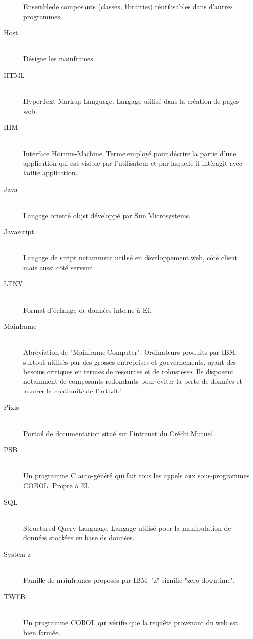 \documentclass[a4paper,french,8pt]{article}
\begin{document}
\begin{description}
				Ensemblede composants (classes, librairies) réutilisables dans d'autres programmes.
			\item[Host]  \hfill \\
				Désigne les mainframes.
			\item[HTML] \hfill \\
				HyperText Markup Language. Langage utilisé dans la création de pages web.
			\item[IHM] \hfill \\
				Interface Homme-Machine. Terme employé pour décrire la partie d'une application qui est visible par l'utilisateur et par laquelle il intéragit avec ladite application.
			\item[Java] \hfill \\
				Langage orienté objet développé par Sun Microsystems.
			\item[Javascript] \hfill \\
				Langage de script notamment utilisé en développement web, côté client mais aussi côté serveur.
			\item[LTNV] \hfill \\
				Format d'échange de données interne à EI.
			\item[Mainframe] \hfill \\
				Abréviation de "Mainframe Computer". Ordinateurs produits par IBM, surtout utilisés par des grosses entreprises et gouvernements,
				ayant des besoins critiques en termes de resources et de robustesse. Ils disposent notamment de composants redondants pour éviter la perte de données et assurer la continuité de l'activité.
			\item[Pixis] \hfill \\
				Portail de documentation situé sur l'intranet du Crédit Mutuel.
			\item[PSB] \hfill \\
				 Un programme C auto-généré qui fait tous les appels aux sous-programmes COBOL. Propre à EI.
			\item[SQL] \hfill \\
				Structured Query Language. Langage utilisé pour la manipulation de données stockées en base de données.
			\item[System z] \hfill \\
				Famille de mainframes proposés par IBM. "z" signifie "zero downtime".
			\item[TWEB] \hfill \\
				Un programme COBOL qui vérifie que la requête provenant du web est bien formée.

\end{description}
\end{document}
